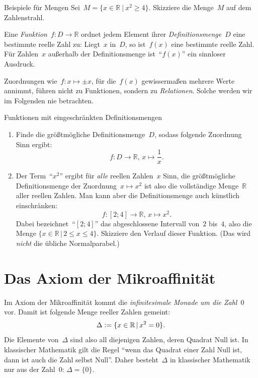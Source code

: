 \documentclass[twoside]{../zirkelblatt}
\newcommand{\RR}{\mathbb{R}}
\newcommand{\defeq}{\vcentcolon=}
\theoremstyle{definition}
\theoremstyle{plain}
\theoremstyle{remark}
\begin{document}
\begin{aufgabeShaded}{Beispiele für Mengen}
Sei~$M = \{ x \in \RR \ |\ x^2 \geq 4 \}$. Skizziere die Menge~$M$ auf dem
Zahlenstrahl.
\end{aufgabeShaded}

Eine \emph{Funktion}~$f : D \to \RR$ ordnet jedem Element ihrer
\emph{Definitionsmenge}~$D$ eine bestimmte reelle Zahl zu: Liegt~$x$ in~$D$, so
ist~$f(x)$ eine bestimmte reelle Zahl. Für Zahlen~$x$ außerhalb der
Definitionsmenge ist~"`$f(x)$"' ein sinnloser Ausdruck.

Zuordnungen wie~$f : x \mapsto \pm x$, für die~$f(x)$ gewissermaßen
mehrere Werte annimmt, führen nicht zu Funktionen, sondern zu \emph{Relationen}.
Solche werden wir im Folgenden nie betrachten.

\begin{aufgabeShaded}{Funktionen mit eingeschränkten Definitionsmengen}
\begin{enumerate}
\item Finde die größtmögliche Definitionsmenge~$D$, sodass folgende Zuordnung
Sinn ergibt:
\[ f : D \to \RR,\,x \mapsto \frac{1}{x}. \]
\item Der Term~"`$x^2$"' ergibt für \emph{alle} reellen Zahlen~$x$ Sinn, die
größtmögliche Definitionsmenge der Zuordnung~$x \mapsto x^2$ ist also die
vollständige Menge~$\RR$ aller reellen Zahlen. Man kann aber die
Definitionsmenge auch künstlich einschränken:
\[ f : [2;4] \to \RR,\,x \mapsto x^2. \]
Dabei bezeichnet~"`$[2;4]$"' das abgeschlossene Intervall von~$2$ bis~$4$, also
die Menge $\{ x \in \RR \,|\, 2 \leq x \leq 4 \}$. Skizziere den Verlauf dieser
Funktion. (Das wird \emph{nicht} die übliche Normalparabel.)
\end{enumerate}
\end{aufgabeShaded}


\section{Das Axiom der Mikroaffinität}

Im Axiom der Mikroaffinität kommt die \emph{infinitesimale Monade um die
Zahl~$0$} vor. Damit ist folgende Menge reeller Zahlen gemeint:
\[ \Delta \defeq \{ x \in \RR \,|\, x^2 = 0 \}. \]
Die Elemente von~$\Delta$ sind also all diejenigen Zahlen, deren Quadrat Null
ist. In klassischer Mathematik gilt die Regel "`wenn das Quadrat einer Zahl
Null ist, dann ist auch die Zahl selbst Null"'. Daher besteht~$\Delta$ in klassischer
Mathematik nur aus der Zahl~$0$: $\Delta = \{ 0 \}$.
\end{document}
